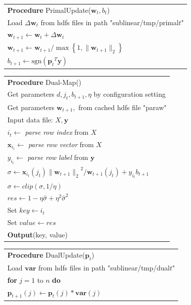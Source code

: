\documentclass{llncs}
\newcommand{\bw}{\mathbf{w}}
\newcommand{\bp}{\mathbf{p}}
\newcommand{\lc}{\left(}
\newcommand{\rc}{\right)}
\newcommand{\tspace}{\hspace*{2em}}
\def\sgn{\mathrm{sgn}}
\begin{document}
    \begin{table}[ht]
	\begin{tabular}{l}
	\hline\noalign{\smallskip}
	\textbf{Procedure} PrimalUpdate($\bw_t, b_t$) \\
	\noalign{\smallskip}
	\hline
	\noalign{\smallskip}
        Load $\Delta \bw_t$ from hdfs files in path "sublinear/tmp/primal$t$" \\
        $\bw_{t+1} \leftarrow \bw_t+\Delta \bw_t$ \\
		${\bw}_{t+1}\leftarrow {\bw}_{t+1}/\max \left\{1,\|{\bw}_{t+1}\|_2 \right\}$ \\
        ${b}_{t+1}\leftarrow \sgn\lc {{\bp}_{t}}^{T}\mathbf{y}\rc$ \\
	\hline
	\end{tabular}
	\end{table}

    \begin{table}[ht]
	\begin{tabular}{l}
	\hline\noalign{\smallskip}
	\textbf{Procedure} Dual-Map() \\
	\noalign{\smallskip}
	\hline
	\noalign{\smallskip}
        Get parameters $d, j_t, b_{t+1}, \eta$  by configuration setting \\
        Get parameters $\bw_{t+1},$ from cached hdfs file "paraw" \\
        Input data file: $X, \mathbf{y}$ \\
        $i_t \leftarrow$ \textit{parse row index} from $X$ \\
        $\mathbf{x}_{i_t} \leftarrow$ \textit{parse row vector} from $X$ \\
        $y_{i_t} \leftarrow$ \textit{parse row label} from $\mathbf{y}$ \\
        $\sigma \leftarrow \mathbf{x}_{i_t} \lc {j}_{t}\rc{\|{\bw}_{t+1}\|_2}^{2}/{\bw}_{t+1}\lc {j}_{t} \rc+{y}_{i_t}{b}_{t+1}$ \\
		$\hat{\sigma} \leftarrow clip\lc \sigma,1/\eta \rc$ \\
		$res \leftarrow 1-\eta\hat{\sigma} + {\eta}^{2}{\hat{\sigma}}^{2} $ \\
        Set $key \leftarrow i_t$ \\
        Set $value \leftarrow res $ \\
        \textbf{Output}(key, value) \\
	\hline
	\end{tabular}
	\end{table}

    \begin{table}[ht]
	\begin{tabular}{l}
	\hline\noalign{\smallskip}
	\textbf{Procedure} DualUpdate($\bp_t$) \\
	\noalign{\smallskip}
	\hline
	\noalign{\smallskip}
        Load $\mathbf{var}$ from hdfs files in path "sublinear/tmp/dual$t$" \\
        \textbf{for} $j=1$ to $n$ \textbf{do} \\
        \tspace $\bp_{t+1}(j) \leftarrow \bp_t(j)*\mathbf{var}(j)$ \\
	\hline
	\end{tabular}
	\end{table}
\end{document}
